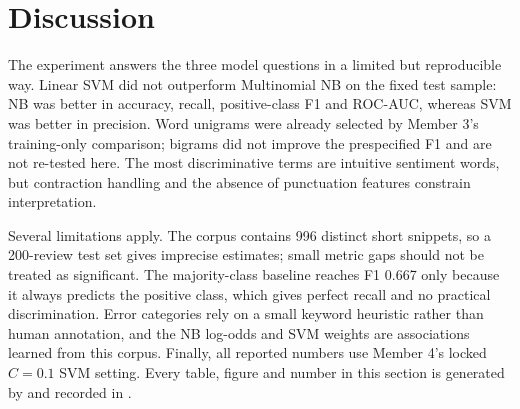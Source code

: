 \section{Discussion}
\label{sec:discussion}

The experiment answers the three model questions in a limited but reproducible
way. Linear SVM did not outperform Multinomial NB on the fixed test sample: NB
was better in accuracy, recall, positive-class F1 and ROC-AUC, whereas SVM was
better in precision. Word unigrams were already selected by Member 3's
training-only comparison; bigrams did not improve the prespecified F1 and are
not re-tested here. The most discriminative terms are intuitive sentiment
words, but contraction handling and the absence of punctuation features
constrain interpretation.

Several limitations apply. The corpus contains 996 distinct short snippets,
so a 200-review test set gives imprecise estimates; small metric gaps should
not be treated as significant. The majority-class baseline reaches F1 0.667
only because it always predicts the positive class, which gives perfect recall
and no practical discrimination. Error categories rely on a small keyword
heuristic rather than human annotation, and the NB log-odds and SVM weights
are associations learned from this corpus. Finally, all reported numbers
use Member 4's locked $C=0.1$ SVM setting. Every table, figure and number in
this section is generated by
 and recorded in
.
